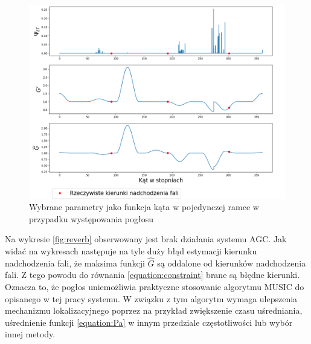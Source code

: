 \begin{figure}[h!]
    \centering
    \includegraphics[width=\textwidth]{Images/reverb_params_in_angle.png}
    \caption{Wybrane parametry jako funkcja kąta w pojedynczej ramce w przypadku występowania pogłosu}
    \label{fig:reverb_params_in_angle}
\end{figure}

\noindent Na wykresie \ref{fig:reverb} obserwowany jest brak działania systemu AGC. Jak widać na wykresach następuje na tyle duży błąd estymacji kierunku nadchodzenia fali, że maksima funkcji $\widehat{G}$ są oddalone od kierunków nadchodzenia fali. Z tego powodu do równania \eqref{equation:constraint} brane są błędne kierunki. Oznacza to, że pogłos uniemożliwia praktyczne stosowanie algorytmu MUSIC do opisanego w tej pracy systemu. W związku z tym algorytm wymaga ulepszenia mechanizmu lokalizacyjnego poprzez na przykład zwiększenie czasu uśredniania, uśrednienie funkcji \eqref{equation:Pa} w innym przedziale częstotliwości lub wybór innej metody.













